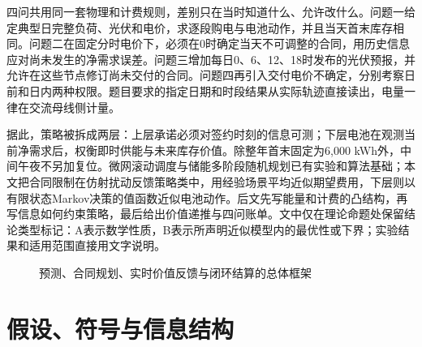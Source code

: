 \documentclass[UTF8,a4paper,zihao=-4,fontset=mac]{ctexart}
\begin{document}
四问共用同一套物理和计费规则，差别只在当时知道什么、允许改什么。问题一给定典型日完整负荷、光伏和电价，求逐段购电与电池动作，并且当天首末库存相同。问题二在固定分时电价下，必须在0时确定当天不可调整的合同，用历史信息应对尚未发生的净需求误差。问题三增加每日0、6、12、18时发布的光伏预报，并允许在这些节点修订尚未交付的合同。问题四再引入交付电价不确定，分别考察日前和日内两种权限。题目要求的指定日期和时段结果从实际轨迹直接读出，电量一律在交流母线侧计量。

据此，策略被拆成两层：上层承诺必须对签约时刻的信息可测；下层电池在观测当前净需求后，权衡即时供能与未来库存价值。除整年首末固定为6,000 kWh外，中间午夜不另加复位。微网滚动调度与储能多阶段随机规划已有实验和算法基础\cite{parisio2014,parisio2016,bhattacharya2018}；本文把合同限制在仿射扰动反馈策略类中\cite{bental2004,goulart2006}，用经验场景平均近似期望费用\cite{kleywegt2002,shapiro2014}，下层则以有限状态Markov决策的值函数近似电池动作\cite{puterman1994,powell2011}。后文先写能量和计费的凸结构，再写信息如何约束策略，最后给出价值递推与四问账单。文中仅在理论命题处保留结论类型标记：A表示数学性质，B表示所声明近似模型内的最优性或下界；实验结果和适用范围直接用文字说明。


\begin{figure}[H]\centering
{}
\caption{预测、合同规划、实时价值反馈与闭环结算的总体框架}
\end{figure}

\section{假设、符号与信息结构}
\end{document}
